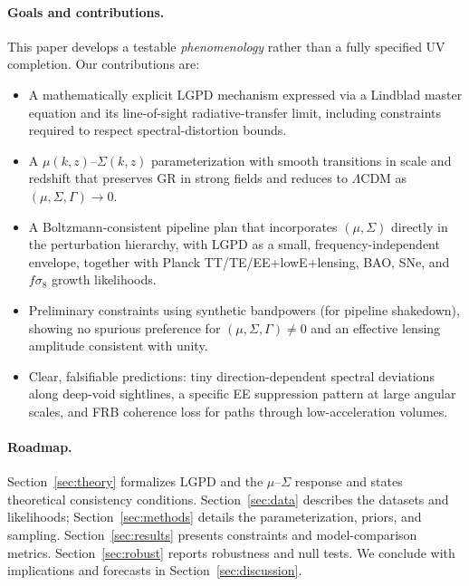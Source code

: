 \paragraph{Goals and contributions.}
This paper develops a testable \emph{phenomenology} rather than a fully specified UV completion. Our contributions are:
\begin{itemize}
  \item A mathematically explicit LGPD mechanism expressed via a Lindblad master equation and its line-of-sight radiative-transfer limit, including constraints required to respect spectral-distortion bounds.
  \item A $\mu(k,z)$--$\Sigma(k,z)$ parameterization with smooth transitions in scale and redshift that preserves GR in strong fields and reduces to $\Lambda$CDM as $(\mu,\Sigma,\Gamma)\to 0$.
  \item A Boltzmann-consistent pipeline plan that incorporates $(\mu,\Sigma)$ directly in the perturbation hierarchy, with LGPD as a small, frequency-independent envelope, together with Planck TT/TE/EE+lowE+lensing, BAO, SNe, and $f\sigma_8$ growth likelihoods.
  \item Preliminary constraints using synthetic bandpowers (for pipeline shakedown), showing no spurious preference for $(\mu,\Sigma,\Gamma)\neq 0$ and an effective lensing amplitude consistent with unity.
  \item Clear, falsifiable predictions: tiny direction-dependent spectral deviations along deep-void sightlines, a specific EE suppression pattern at large angular scales, and FRB coherence loss for paths through low-acceleration volumes.
\end{itemize}

\paragraph{Roadmap.}
Section~\ref{sec:theory} formalizes LGPD and the $\mu$--$\Sigma$ response and states theoretical consistency conditions. Section~\ref{sec:data} describes the datasets and likelihoods; Section~\ref{sec:methods} details the parameterization, priors, and sampling. Section~\ref{sec:results} presents constraints and model-comparison metrics. Section~\ref{sec:robust} reports robustness and null tests. We conclude with implications and forecasts in Section~\ref{sec:discussion}.
